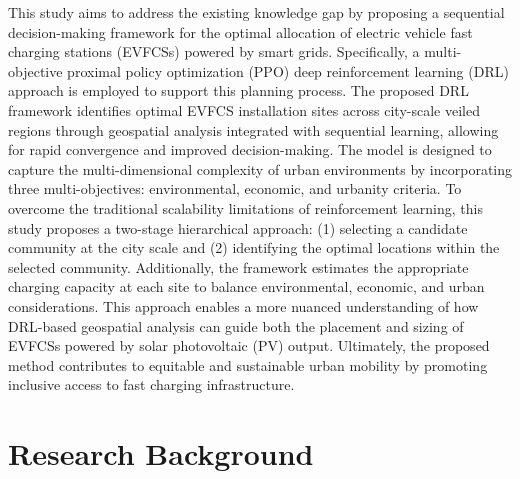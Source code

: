 \documentclass[preprint,12pt]{elsarticle}
\begin{document}
This study aims to address the existing knowledge gap by proposing a sequential decision-making framework for the optimal allocation of electric vehicle fast charging stations (EVFCSs) powered by smart grids. Specifically, a multi-objective proximal policy optimization (PPO) deep reinforcement learning (DRL) approach is employed to support this planning process. The proposed DRL framework identifies optimal EVFCS installation sites across city-scale veiled regions through geospatial analysis integrated with sequential learning, allowing for rapid convergence and improved decision-making. The model is designed to capture the multi-dimensional complexity of urban environments by incorporating three multi-objectives: environmental, economic, and urbanity criteria. To overcome the traditional scalability limitations of reinforcement learning, this study proposes a two-stage hierarchical approach: (1) selecting a candidate community at the city scale and (2) identifying the optimal locations within the selected community. Additionally, the framework estimates the appropriate charging capacity at each site to balance environmental, economic, and urban considerations. This approach enables a more nuanced understanding of how DRL-based geospatial analysis can guide both the placement and sizing of EVFCSs powered by solar photovoltaic (PV) output. Ultimately, the proposed method contributes to equitable and sustainable urban mobility by promoting inclusive access to fast charging infrastructure. 

\vspace{0.5cm}

\section{Research Background}
\end{document}
